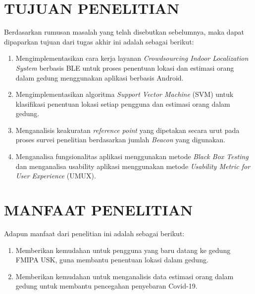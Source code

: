 \section{\uppercase{TUJUAN PENELITIAN}}
Berdasarkan rumusan masalah yang telah disebutkan sebelumnya, maka dapat dipaparkan tujuan dari tugas akhir ini adalah sebagai berikut:
\begin{enumerate}
	\item Mengimplementasikan cara kerja layanan \textit{Crowdsourcing Indoor Localization System} berbasis BLE untuk proses penentuan lokasi dan estimasi orang dalam gedung menggunakan aplikasi berbasis Android.
	\item Mengimplementasikan algoritma \textit{\textit{Support Vector Machine}} (SVM) untuk klasifikasi penentuan lokasi setiap pengguna dan estimasi orang dalam gedung.
	\item Menganalisis keakuratan \textit{reference point} yang dipetakan secara urut pada proses survei penelitian berdasarkan jumlah \textit{Beacon} yang digunakan.
	\item Menganalisa fungsionalitas aplikasi menggunakan metode \textit{Black Box Testing} dan menganalisa usability aplikasi menggunakan metode \textit{Usability Metric for User Experience} (UMUX).
\end{enumerate}


\section{\uppercase{manfaat penelitian}}
Adapun manfaat dari penelitian ini adalah sebagai berikut:
\begin{enumerate}
	\item Memberikan kemudahan untuk pengguna yang baru datang ke gedung FMIPA USK, guna membantu penentuan lokasi dalam gedung.
	\item Memberikan kemudahan untuk menganalisis data estimasi orang dalam gedung untuk membantu pencegahan penyebaran Covid-19.

\end{enumerate}


\begin{comment}

\end{comment}